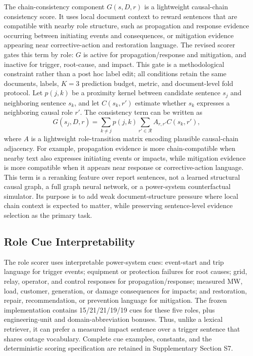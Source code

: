 \documentclass{article}
\begin{document}
The chain-consistency component $G(s,D,r)$ is a lightweight causal-chain consistency score. It uses local document context to reward sentences that are compatible with nearby role structure, such as propagation and response evidence occurring between initiating events and consequences, or mitigation evidence appearing near corrective-action and restoration language. The revised scorer gates this term by role: $G$ is active for propagation/response and mitigation, and inactive for trigger, root-cause, and impact. This gate is a methodological constraint rather than a post hoc label edit; all conditions retain the same documents, labels, $K=3$ prediction budget, metric, and document-level fold protocol. Let $p(j,k)$ be a proximity kernel between candidate sentence $s_j$ and neighboring sentence $s_k$, and let $C(s_k,r')$ estimate whether $s_k$ expresses a neighboring causal role $r'$. The consistency term can be written as
\begin{equation}
G(s_j,D,r)=
\sum_{k\neq j} p(j,k)
\sum_{r'\in\mathcal{R}} A_{r,r'} C(s_k,r'),
\label{eq:chain}
\end{equation}
where $A$ is a lightweight role-transition matrix encoding plausible causal-chain adjacency. For example, propagation evidence is more chain-compatible when nearby text also expresses initiating events or impacts, while mitigation evidence is more compatible when it appears near response or corrective-action language. This term is a reranking feature over report sentences, not a learned structural causal graph, a full graph neural network, or a power-system counterfactual simulator. Its purpose is to add weak document-structure pressure where local chain context is expected to matter, while preserving sentence-level evidence selection as the primary task.

\subsection{Role Cue Interpretability}
\label{sec:role_cue_interpretability}

The role scorer uses interpretable power-system cues: event-start and trip language for trigger events; equipment or protection failures for root causes; grid, relay, operator, and control responses for propagation/response; measured MW, load, customer, generation, or damage consequences for impacts; and restoration, repair, recommendation, or prevention language for mitigation. The frozen implementation contains 15/21/21/19/19 cues for these five roles, plus engineering-unit and domain-abbreviation bonuses. Thus, unlike a lexical retriever, it can prefer a measured impact sentence over a trigger sentence that shares outage vocabulary. Complete cue examples, constants, and the deterministic scoring specification are retained in Supplementary Section S7.
\end{document}
